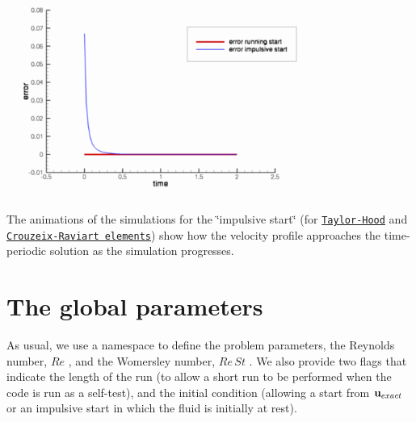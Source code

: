  
\begin{DoxyImage}
\includegraphics[width=0.75\textwidth]{error}
\end{DoxyImage}


The animations of the simulations for the \char`\"{}impulsive start\char`\"{} (for \href{../figures/velocity_vectors_TH.avi}{\tt Taylor-\/\+Hood} and \href{../figures/velocity_vectors_CR.avi}{\tt Crouzeix-\/\+Raviart elements}) show how the velocity profile approaches the time-\/periodic solution as the simulation progresses.



 

\hypertarget{index_namespace}{}\section{The global parameters}\label{index_namespace}
As usual, we use a namespace to define the problem parameters, the Reynolds number, $ Re$ , and the Womersley number, $ Re\, St$ . We also provide two flags that indicate the length of the run (to allow a short run to be performed when the code is run as a self-\/test), and the initial condition (allowing a start from $ {\bf u}_{exact}$ or an impulsive start in which the fluid is initially at rest).

